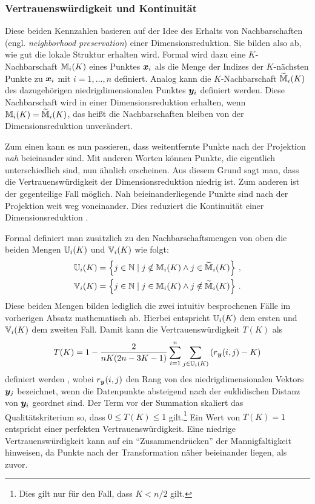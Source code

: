 
\subsubsection{Vertrauenswürdigkeit und Kontinuität}
\label{ch:Vergleich:sec:Methodik:subsec:Qualitaetskriterien:TC}
Diese beiden Kennzahlen basieren auf der Idee des Erhalts von Nachbarschaften (engl.
\textit{neighborhood preservation}) einer Dimensionsreduktion. Sie bilden also ab, wie gut die
lokale Struktur erhalten wird. Formal wird dazu eine $K$-Nachbarschaft $\mathbb{M}_i(K)$ eines Punktes $\bm{x}_i$ als die Menge der Indizes der $K$-nächsten Punkte zu $\bm{x}_i$ mit $i = 1, \ldots, n$ definiert.
Analog kann die $K$-Nachbarschaft $\widetilde{\mathbb{M}}_i(K)$ des dazugehörigen niedrigdimensionalen
Punktes $\bm{y}_i$ definiert werden. Diese Nachbarschaft wird in einer Dimensionsreduktion
erhalten, wenn $\mathbb{M}_i(K) = \widetilde{\mathbb{M}}_i(K)$, das heißt die Nachbarschaften bleiben von
der Dimensionsreduktion unverändert.

Zum einen kann es nun passieren, dass weitentfernte Punkte nach der Projektion \textit{nah}
beieinander sind. Mit anderen Worten können Punkte, die eigentlich unterschiedlich sind, nun
ähnlich erscheinen. Aus diesem Grund sagt man, dass die Vertrauenswürdigkeit der
Dimensionsreduktion niedrig ist. Zum anderen ist der gegenteilige Fall möglich. Nah
beieinanderliegende Punkte sind nach der Projektion weit weg voneinander. Dies reduziert die
Kontinuität einer Dimensionsreduktion \parencite[486 -- 487]{Venna.2001}.

Formal definiert man zusätzlich zu den Nachbarschaftsmengen von oben die beiden Mengen
$\mathbb{U}_i(K)$ und $\mathbb{V}_i(K)$ wie folgt:
\begin{gather}
	\mathbb{U}_i(K) =  \left\{ j \in \mathbb{N} \mid j \notin \mathbb{M}_i(K) \land j \in \widetilde{\mathbb{M}}_i(K) \right\} \, , \\
	\mathbb{V}_i(K) =  \left\{ j \in \mathbb{N} \mid j \in \mathbb{M}_i(K) \land j \notin \widetilde{\mathbb{M}}_i(K) \right\} \, .
\end{gather}
Diese beiden Mengen bilden lediglich die zwei intuitiv besprochenen Fälle im vorherigen Absatz mathematisch ab. Hierbei entspricht $\mathbb{U}_i(K)$ dem ersten und $\mathbb{V}_i(K)$ dem zweiten Fall.
Damit kann die Vertrauenswürdigkeit $T(K)$ als
\begin{equation}
	T(K) = 1 - \frac{2}{nK(2n - 3K - 1)} \sum_{i = 1}^{n}\sum_{j \in \set{U}_i(K) } \left( r­_{\vect{y}}(i, j) - K \right)
\end{equation}
definiert werden \parencite[487]{Venna.2001}, wobei $r_{\bm{y}}(i, j)$ den Rang von des niedrigdimensionalen Vektors
$\bm{y}_j$ bezeichnet, wenn die Datenpunkte absteigend nach der euklidischen Distanz von
$\bm{y}_i$ geordnet sind. Der Term vor der Summation skaliert das Qualitätskriterium so, dass $0
	\leq T(K) \leq 1$ gilt.\footnote{Dies gilt nur für den Fall, dass $K < n/2$ gilt.} Ein Wert von
$T(K) = 1­$ entspricht einer perfekten Vertrauenswürdigkeit. Eine niedrige Vertrauenswürdigkeit
kann auf ein \enquote{Zusammendrücken} der Mannigfaltigkeit hinweisen, da Punkte nach der
Transformation näher beieinander liegen, als zuvor.

